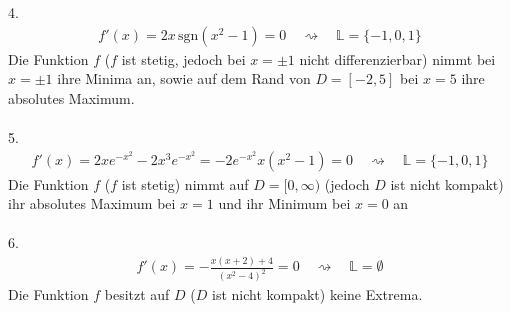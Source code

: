 \documentclass[11pt,answers]{exam}
\begin{document}
\begin{questions}
\begin{solution}
4.
\begin{align*}
f'(x)=2x\,\text{sgn}(x^2-1)=0
\quad\rightsquigarrow\quad
\mathbb{L}=\{-1,0,1\}
\end{align*}
Die Funktion $f$ ($f$ ist stetig, jedoch bei $x=\pm 1$ nicht differenzierbar) nimmt bei $x=\pm 1$ ihre Minima an, sowie auf dem Rand von $D=[-2,5]$ bei $x=5$ ihre absolutes Maximum. 
\\ \\
5.
\begin{align*}
f'(x)=2xe^{-x^2}-2 x^3e^{-x^2}=-2 e^{-x^2} x \left(x^2-1\right)=0
\quad\rightsquigarrow\quad
\mathbb{L}=\{-1,0,1\}
\end{align*}
Die Funktion $f$ ($f$ ist stetig) nimmt auf $D=[0,\infty)$ (jedoch $D$ ist nicht kompakt) ihr absolutes Maximum bei $x=1$ und ihr Minimum bei $x=0$ an
\\ \\
6.
\begin{align*}
f'(x)=-\frac{x (x+2)+4}{\left(x^2-4\right)^2}=0
\quad\rightsquigarrow\quad
\mathbb{L}=\emptyset
\end{align*}
Die Funktion $f$ besitzt auf $D$ ($D$ ist nicht kompakt) keine Extrema.
\end{solution}



\end{questions}
\end{document}
